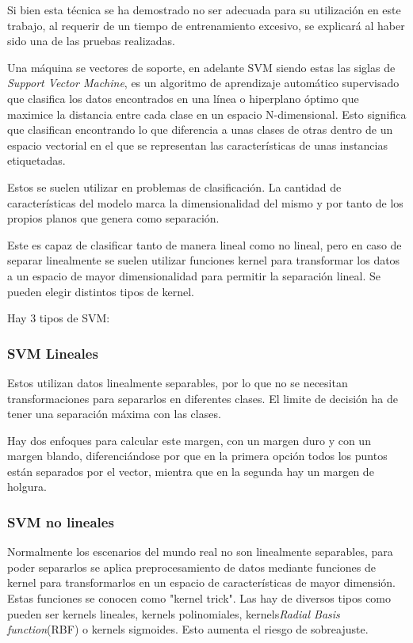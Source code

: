 Si bien esta técnica se ha demostrado no ser adecuada para su utilización en este trabajo, al requerir de un tiempo de entrenamiento excesivo, se explicará al haber sido una de las pruebas realizadas.

Una máquina se vectores de soporte\cite{ibmWhatSupport}, en adelante SVM siendo estas las siglas de \textit{Support Vector Machine},  es un algoritmo de aprendizaje automático supervisado que clasifica los datos encontrados en una línea o hiperplano óptimo que maximice la distancia entre cada clase en un espacio N-dimensional. Esto significa que clasifican encontrando lo que diferencia a unas clases de otras dentro de un espacio vectorial en el que se representan las características de unas instancias etiquetadas.

Estos se suelen utilizar en problemas de clasificación. La cantidad de características del modelo marca la dimensionalidad del mismo y por tanto de los propios planos que genera como separación.

Este es capaz de clasificar tanto de manera lineal como no lineal, pero en caso de separar linealmente se suelen utilizar funciones kernel para transformar los datos a un espacio de mayor dimensionalidad para permitir la separación lineal. Se pueden elegir distintos tipos de kernel.

Hay 3 tipos de SVM:

\subsubsection{SVM Lineales}
Estos utilizan datos linealmente separables, por lo que no se necesitan transformaciones para separarlos en diferentes clases. El limite de decisión  ha de tener una separación máxima con las clases. 


Hay dos enfoques para calcular este margen, con un margen duro y con un margen blando, diferenciándose por que en la primera opción todos los puntos están separados por el vector, mientra que en la segunda hay un margen de holgura.

\subsubsection{SVM no lineales}
Normalmente los escenarios del mundo real no son linealmente separables, para poder separarlos se aplica preprocesamiento de datos mediante funciones de kernel para transformarlos en un espacio de características de mayor dimensión. Estas funciones se conocen como "kernel trick". Las hay de diversos tipos como pueden ser kernels lineales, kernels polinomiales, kernels\textit{Radial Basis function}(RBF) o kernels sigmoides. Esto aumenta el riesgo de sobreajuste.

